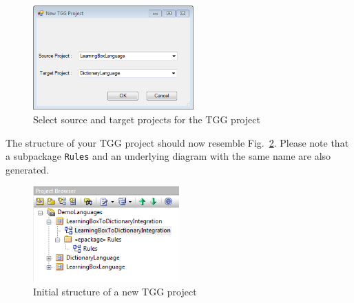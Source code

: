 \begin{enumerate}
\begin{figure}[htbp]
\begin{center}
  \includegraphics[width=0.55\textwidth]{pics/tggBilder/tggSchema/tgg2}
  \caption{Select source and target projects for the TGG project}  
  \label{fig:select_source_target}
\end{center}
\end{figure}
\end{enumerate}

The structure of your TGG project should now resemble Fig.~\ref{fig:new_tgg_project}.
Please note that a subpackage \texttt{Rules} and an underlying diagram with the same name are also generated.

\begin{figure}[htbp]
\begin{center}
  \includegraphics[width=0.5\textwidth]{pics/tggBilder/tggSchema/tgg3}
  \caption{Initial structure of a new TGG project}  
  \label{fig:new_tgg_project}
\end{center}
\end{figure}

